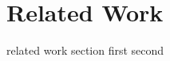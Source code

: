 \section{Related Work}

related work section
first\cite{kaofunny}
second\cite{ritchie2005computational}